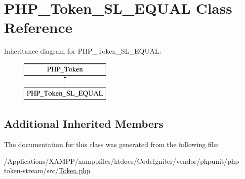 \hypertarget{class_p_h_p___token___s_l___e_q_u_a_l}{}\section{P\+H\+P\+\_\+\+Token\+\_\+\+S\+L\+\_\+\+E\+Q\+U\+AL Class Reference}
\label{class_p_h_p___token___s_l___e_q_u_a_l}
Inheritance diagram for P\+H\+P\+\_\+\+Token\+\_\+\+S\+L\+\_\+\+E\+Q\+U\+AL\+:\begin{figure}[H]
\begin{center}
\leavevmode
\includegraphics[height=2.000000cm]{class_p_h_p___token___s_l___e_q_u_a_l}
\end{center}
\end{figure}
\subsection*{Additional Inherited Members}


The documentation for this class was generated from the following file\+:\begin{DoxyCompactItemize}
\item 
/\+Applications/\+X\+A\+M\+P\+P/xamppfiles/htdocs/\+Code\+Igniter/vendor/phpunit/php-\/token-\/stream/src/\mbox{\hyperlink{_token_8php}{Token.\+php}}\end{DoxyCompactItemize}
